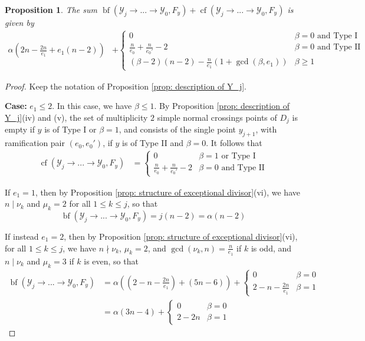 \documentclass[12pt]{amsart}
\numberwithin{equation}{section}
\newtheorem{prop}[equation]{Proposition}
\theoremstyle{definition}
\newcommand{\Y}{\mathcal{Y}}
\newcommand{\tx}[1]{\text{#1}}
\DeclareMathOperator{\blf}{bf}
\DeclareMathOperator{\cf}{cf}
\begin{document}
\begin{prop}\label{prop: preliminary cdc}
    The sum $\blf(\Y_j\to...\to\Y_0,F_y)+\cf(\Y_j\to...\to\Y_0,F_y)$ is given by
    \begin{align*} \alpha(2n-\frac{2n}{e_1}+e_1(n-2))&+ \begin{cases}
            0& \beta=0\tx{ and Type I}\\
            \frac{n}{e_0}+\frac{n}{e_0'}-2&\beta=0\tx{ and Type II}\\
            (\beta-2)(n-2)-\frac{n}{e_1}(1+\gcd(\beta,e_1))&\beta\geq 1
    \end{cases}
    \end{align*}
\end{prop}
\begin{proof} 
    Keep the notation of Proposition \ref{prop: description of Y_j}. 
    
    \textbf{Case:} $e_1\leq 2$. In this case, we have $\beta\leq 1$. By Proposition \ref{prop: description of Y_j}(iv) and (v), the set of multiplicity $2$ simple normal crossings points of $D_j$ is empty if $y$ is of Type I or $\beta=1$, and consists of the single point $y_{j+1}$, with ramification pair $(e_0,e_0')$, if $y$ is of Type II and $\beta=0$. It follows that
    \begin{align*}
        \cf(\Y_j\to...\to\Y_0,F_y)&=\begin{cases}
            0&\beta=1 \tx{ or Type I}\\
            \frac{n}{e_0}+\frac{n}{e_0'}-2&\beta=0\tx{ and Type II}
        \end{cases}
    \end{align*}

    If $e_1=1$, then by Proposition \ref{prop: structure of exceptional divisor}(vi), we have $n\mid\nu_k$ and $\mu_k=2$ for all $1\leq k\leq j$, so that
    \[\blf(\Y_j\to...\to\Y_0,F_y)=j(n-2)=\alpha(n-2)\]

    If instead $e_1=2$, then by Proposition \ref{prop: structure of exceptional divisor}(vi), for all $1\leq k\leq j$, we have $n\nmid\nu_k$, $\mu_k=2$, and $\gcd(\nu_k,n)=\frac{n}{e_1}$ if $k$ is odd, and $n\mid\nu_k$ and $\mu_k=3$ if $k$ is even, so that
    \begin{align*}\blf(\Y_j\to...\to\Y_0,F_y)&=\alpha((2-n-\frac{2n}{e_1})+(5n-6))+\begin{cases}
        0&\beta=0\\2-n-\frac{2n}{e_1}&\beta=1
    \end{cases}\\
    &=\alpha(3n-4)+\begin{cases}
        0&\beta=0\\2-2n&\beta=1
    \end{cases}
    \end{align*}


\end{proof}
\end{document}
